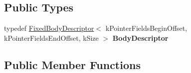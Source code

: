 \subsection*{Public Types}
\begin{DoxyCompactItemize}
\item 
typedef \hyperlink{classv8_1_1internal_1_1_fixed_body_descriptor}{Fixed\+Body\+Descriptor}$<$ k\+Pointer\+Fields\+Begin\+Offset, k\+Pointer\+Fields\+End\+Offset, k\+Size $>$ {\bfseries Body\+Descriptor}\hypertarget{classv8_1_1internal_1_1_map_a3a7765ae1b838d6f5b8b87b1955b9e96}{}\label{classv8_1_1internal_1_1_map_a3a7765ae1b838d6f5b8b87b1955b9e96}

\end{DoxyCompactItemize}
\subsection*{Public Member Functions}
